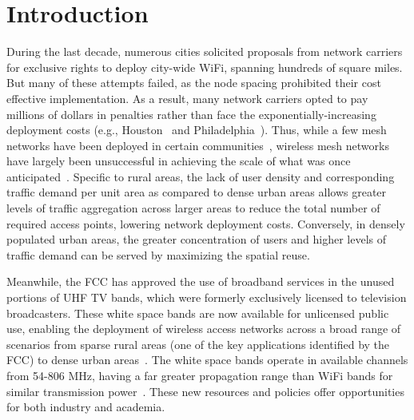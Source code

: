 \section{Introduction}
\label{sec:introduction}



During the last decade, numerous cities solicited proposals from network carriers for 
exclusive rights to deploy city-wide WiFi, spanning hundreds of square miles. But many 
of these attempts failed, as the node spacing prohibited their cost effective implementation. 
As a result, many network carriers opted to pay millions 
of dollars in penalties rather than face the exponentially-increasing deployment costs 
(e.g., Houston~\cite{cnet_aug07} and Philadelphia~\cite{arstechnica_may08}). 
Thus, while a few mesh networks have been deployed in certain communities~\cite{CRSK06},
wireless mesh networks have largely been unsuccessful in achieving the scale of what was 
once anticipated~\cite{taps}. Specific to rural areas, the lack of user density and 
corresponding traffic demand per unit area as compared to dense urban areas allows greater 
levels of traffic aggregation across larger areas to reduce the total number of required access points, lowering
network deployment costs. Conversely, in densely populated urban areas, the greater concentration of users 
and higher levels of traffic demand can be served by maximizing the spatial reuse. 

Meanwhile, the FCC has approved the use of broadband services in the unused portions of 
UHF TV bands, which were formerly exclusively licensed to television broadcasters. 
These white space bands are now available for unlicensed public use, enabling the deployment 
of wireless access networks across a broad range of scenarios from sparse rural areas 
(one of the key applications identified by the FCC) to dense urban areas~\cite{carlson}. 
The white space bands operate in available channels from 54-806 MHz, having a far greater 
propagation range than WiFi bands for similar transmission power~\cite{balanis2012antenna}.
These new resources and policies offer opportunities for both industry and academia. 

